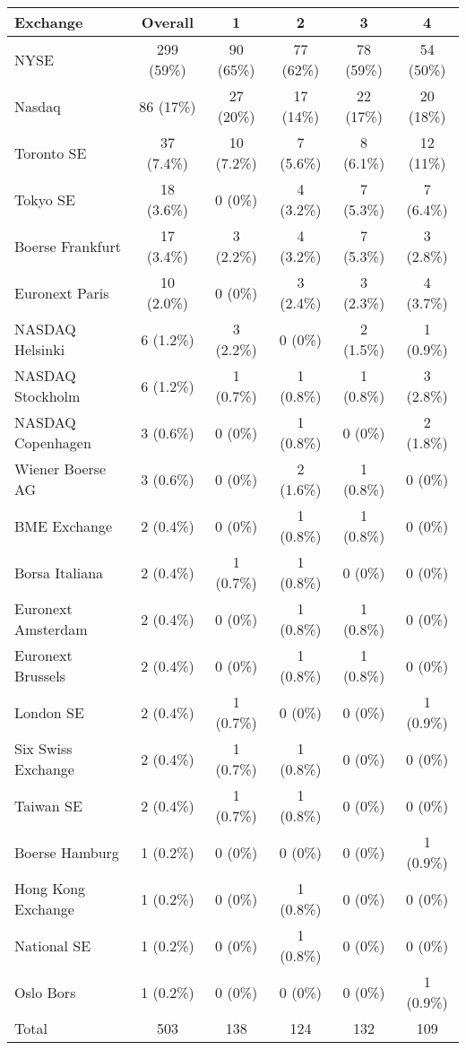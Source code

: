 \documentclass[12pt]{article}
\begin{document}
\newpage
\begin{table}
    \centering
    \label{tab:exchngs_sale}
    
    \begin{tabular}{lccccc}
        \toprule
        Exchange & Overall & 1 & 2 & 3 & 4 \\
        \midrule
        NYSE & 299 (59\%) & 90 (65\%) & 77 (62\%) & 78 (59\%) & 54 (50\%)\\
        Nasdaq & 86 (17\%) & 27 (20\%) & 17 (14\%) & 22 (17\%) & 20 (18\%)\\
        Toronto SE & 37 (7.4\%) & 10 (7.2\%) & 7 (5.6\%) & 8 (6.1\%) & 12 (11\%)\\
        Tokyo SE & 18 (3.6\%) & 0 (0\%) & 4 (3.2\%) & 7 (5.3\%) & 7 (6.4\%)\\
        Boerse Frankfurt & 17 (3.4\%) & 3 (2.2\%) & 4 (3.2\%) & 7 (5.3\%) & 3 (2.8\%)\\
        Euronext Paris & 10 (2.0\%) & 0 (0\%) & 3 (2.4\%) & 3 (2.3\%) & 4 (3.7\%)\\
        NASDAQ Helsinki & 6 (1.2\%) & 3 (2.2\%) & 0 (0\%) & 2 (1.5\%) & 1 (0.9\%)\\
        NASDAQ Stockholm & 6 (1.2\%) & 1 (0.7\%) & 1 (0.8\%) & 1 (0.8\%) & 3 (2.8\%)\\
        NASDAQ Copenhagen & 3 (0.6\%) & 0 (0\%) & 1 (0.8\%) & 0 (0\%) & 2 (1.8\%)\\
        Wiener Boerse AG & 3 (0.6\%) & 0 (0\%) & 2 (1.6\%) & 1 (0.8\%) & 0 (0\%)\\
        BME Exchange & 2 (0.4\%) & 0 (0\%) & 1 (0.8\%) & 1 (0.8\%) & 0 (0\%)\\
        Borsa Italiana & 2 (0.4\%) & 1 (0.7\%) & 1 (0.8\%) & 0 (0\%) & 0 (0\%)\\
        Euronext Amsterdam & 2 (0.4\%) & 0 (0\%) & 1 (0.8\%) & 1 (0.8\%) & 0 (0\%)\\
        Euronext Brussels & 2 (0.4\%) & 0 (0\%) & 1 (0.8\%) & 1 (0.8\%) & 0 (0\%)\\
        London SE & 2 (0.4\%) & 1 (0.7\%) & 0 (0\%) & 0 (0\%) & 1 (0.9\%)\\
        Six Swiss Exchange & 2 (0.4\%) & 1 (0.7\%) & 1 (0.8\%) & 0 (0\%) & 0 (0\%)\\
        Taiwan SE & 2 (0.4\%) & 1 (0.7\%) & 1 (0.8\%) & 0 (0\%) & 0 (0\%)\\
        Boerse Hamburg & 1 (0.2\%) & 0 (0\%) & 0 (0\%) & 0 (0\%) & 1 (0.9\%)\\
        Hong Kong Exchange & 1 (0.2\%) & 0 (0\%) & 1 (0.8\%) & 0 (0\%) & 0 (0\%)\\
        National SE & 1 (0.2\%) & 0 (0\%) & 1 (0.8\%) & 0 (0\%) & 0 (0\%)\\
        Oslo Bors & 1 (0.2\%) & 0 (0\%) & 0 (0\%) & 0 (0\%) & 1 (0.9\%)\\
        \midrule
        Total & 503 & 138 & 124 & 132 & 109\\
        \bottomrule
    \end{tabular}


\end{table}
\end{document}
